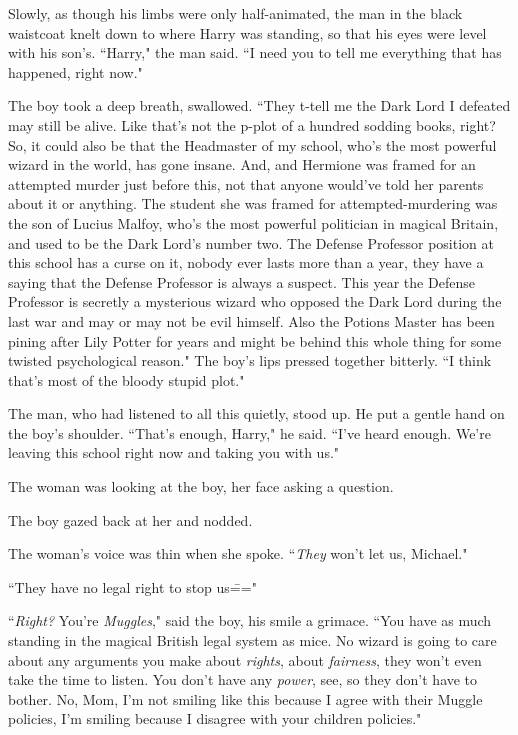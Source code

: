Slowly, as though his limbs were only half-animated, the man in the black waistcoat knelt down to where Harry was standing, so that his eyes were level with his son's. ``Harry," the man said. ``I need you to tell me everything that has happened, right now."

The boy took a deep breath, swallowed. ``They t-tell me the Dark Lord I defeated may still be alive. Like that's not the p-plot of a hundred sodding books, right? So, it could also be that the Headmaster of my school, who's the most powerful wizard in the world, has gone insane. And, and Hermione was framed for an attempted murder just before this, not that anyone would've told her parents about it or anything. The student she was framed for attempted-murdering was the son of Lucius Malfoy, who's the most powerful politician in magical Britain, and used to be the Dark Lord's number two. The Defense Professor position at this school has a curse on it, nobody ever lasts more than a year, they have a saying that the Defense Professor is always a suspect. This year the Defense Professor is secretly a mysterious wizard who opposed the Dark Lord during the last war and may or may not be evil himself. Also the Potions Master has been pining after Lily Potter for years and might be behind this whole thing for some twisted psychological reason." The boy's lips pressed together bitterly. ``I think that's most of the bloody stupid plot."

The man, who had listened to all this quietly, stood up. He put a gentle hand on the boy's shoulder. ``That's enough, Harry," he said. ``I've heard enough. We're leaving this school right now and taking you with us."

The woman was looking at the boy, her face asking a question.

The boy gazed back at her and nodded.

The woman's voice was thin when she spoke. ``\emph{They} won't let us, Michael."

``They have no legal right to stop us\==="

``\emph{Right?} You're \emph{Muggles}," said the boy, his smile a grimace. ``You have as much standing in the magical British legal system as mice. No wizard is going to care about any arguments you make about \emph{rights}, about \emph{fairness}, they won't even take the time to listen. You don't have any \emph{power}, see, so they don't have to bother. No, Mom, I'm not smiling like this because I agree with their Muggle policies, I'm smiling because I disagree with your children policies."

